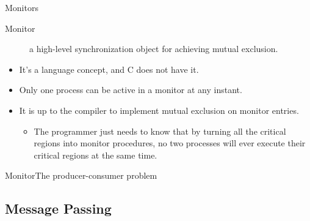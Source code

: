 \begin{frame}{Monitors}
  \begin{description}
  \item[Monitor] a high-level synchronization object for achieving mutual exclusion.
  \end{description}
  \begin{minipage}{.6\linewidth}
    \begin{itemize}
    \item It's a language concept, and C does not have it.
    \item Only one process can be active in a monitor at any instant.
    \item It is up to the compiler to implement mutual exclusion on monitor entries.
      \begin{itemize}
      \item The programmer just needs to know that by turning all the critical regions
        into monitor procedures, no two processes will ever execute their critical regions
        at the same time.
      \end{itemize}
    \end{itemize}
  \end{minipage}
  \hfill
  \begin{minipage}{.39\linewidth}
    \begin{center}
       
    \end{center}
  \end{minipage}
\end{frame}

\begin{frame}{Monitor}{The producer-consumer problem}
  \begin{center}
     
  \end{center}
\end{frame}

\subsection{Message Passing}
\label{sec:message-passing}  

